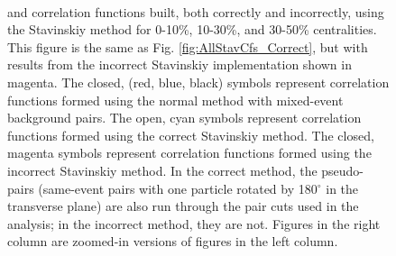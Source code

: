 \documentclass[/home/jesse/Analysis/FemtoAnalysis/AnalysisNotes/AnalysisNoteJBuxton.tex]{subfiles}
\begin{document}
\begin{figure}[h!]
  \\         
    
  \caption[\LamK Stavinskiy Correlation Functions (Correct and Incorrect)]{\LamK and \ALamAK correlation functions built, both correctly and incorrectly, using the Stavinskiy method for 0-10\%, 10-30\%, and 30-50\% centralities.  This figure is the same as Fig. \ref{fig:AllStavCfs_Correct}, but with results from the incorrect Stavinskiy implementation shown in magenta.  The closed, (red, blue, black) symbols represent correlation functions formed using the normal method with mixed-event background pairs.  The open, cyan symbols represent correlation functions formed using the correct Stavinskiy method.  The closed, magenta symbols represent correlation functions formed using the incorrect Stavinskiy method.  In the correct method, the pseudo-pairs (same-event pairs with one particle rotated by 180$^\circ$ in the transverse plane) are also run through the pair cuts used in the analysis; in the incorrect method, they are not.  Figures in the right column are zoomed-in versions of figures in the left column.}
  \label{fig:AllStavCfs_CorrectAndIncorrect}
\end{figure}
\end{document}
